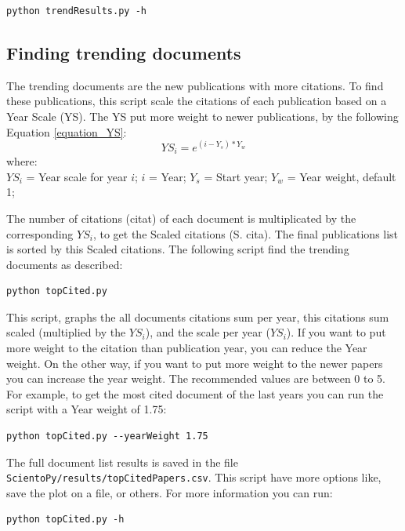 \documentclass[10pt,letterpaper]{article}
\begin{document}
\begin{verbatim}
python trendResults.py -h
\end{verbatim}


\subsection{Finding trending documents}

The trending documents are the new publications with more citations. To find these publications, this script scale the citations of each publication based on a Year Scale (YS). The YS put more weight to newer publications, by the following Equation \eqref{equation_YS}:
\begin{equation}
YS_i = e^{(i - Y_s)*Y_w}
\label{equation_YS}
\end{equation}
where:\\
$YS_i$ = Year scale for year $i$;
$i$ = Year;
$Y_s$ = Start year;
$Y_w$ = Year weight, default 1;
\newline

The number of citations (citat) of each document is multiplicated by the corresponding $YS_i$, to get the Scaled citations (S. cita). The final publications list is sorted by this Scaled citations. The following script find the trending documents as described:

\begin{verbatim}
python topCited.py
\end{verbatim}

This script, graphs the all documents citations sum per year, this citations sum scaled (multiplied by the $YS_i$), and the scale per year ($YS_i$). If you want to put more weight to the citation than publication year, you can reduce the Year weight. On the other way, if you want to put more weight to the newer papers you can increase the year weight. The recommended values are between 0 to 5. For example, to get the most cited document of the last years you can run the script with a Year weight of 1.75:

\begin{verbatim}
python topCited.py --yearWeight 1.75
\end{verbatim}


The full document list results is saved in the file \verb|ScientoPy/results/topCitedPapers.csv|. This script have more options like, save the plot on a file, or others. For more information you can run:

\begin{verbatim}
python topCited.py -h
\end{verbatim}
\end{document}
